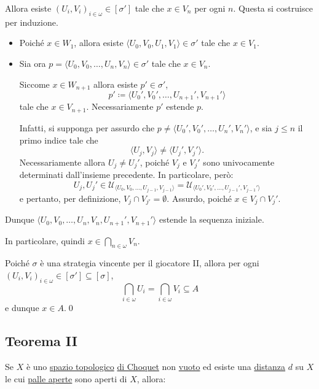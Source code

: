 \documentclass{article}
\newcommand{\1}{\mathds{1}}
\begin{document}
Allora esiste \((U_{i}, V_{i})_{i \in \omega} \in [\sigma']\) tale che \(x \in V_{n}\) per ogni \(n\). Questa si costruisce per induzione.
\begin{itemize}
\item Poiché \(x \in W_{1}\), allora esiste \(\langle U_{0},V_{0},U_{1},V_{1}\rangle \in \sigma'\) tale che \(x \in V_{1}\).
\item Sia ora \(p=\langle U_{0},V_{0},\dots,U_{n}, V_{n}\rangle \in\sigma'\) tale che \(x \in V_{n}\).

Siccome \(x \in W_{n+1}\) allora esiste \(p' \in\sigma'\),
\begin{equation*}
  p'\coloneqq \langle U_{0}',V_{0}',\dots,U_{n+1}',V_{n+1}'\rangle
\end{equation*}
tale che \(x \in V_{n+1}\). Necessariamente \(p'\) estende \(p\).

Infatti, si supponga per assurdo che \(p \neq \langle U_{0}',V_{0}',\dots,U_{n}',V_{n}'\rangle\), e sia \(j\le n\) il primo indice tale che
\begin{equation*}
  \langle U_{j}, V_{j}\rangle \neq \langle U_{j}', V_{j}'\rangle.
\end{equation*}
Necessariamente allora \(U_{j}\neq U_{j}'\), poiché \(V_{j}\) e \(V_{j}'\) sono univocamente determinati dall'insieme precedente. In particolare, però:
\begin{equation*}
  U_{j}, U_{j}' \in \mathcal{U}_{\langle U_{0},V_{0},\dots,U_{j-1},V_{j-1}\rangle} = \mathcal{U}_{\langle U_{0}',V_{0}',\dots,U_{j-1}',V_{j-1}'\rangle}
\end{equation*}
e pertanto, per definizione, \(V_{j}\cap V_{j'} = \emptyset\). Assurdo, poiché \(x \in V_{j}\cap V_{j}'\).
\end{itemize}

Dunque \(\langle U_{0},V_{0},\dots,U_{n}, V_{n}, U_{n+1}', V_{n+1}'\rangle\) estende la sequenza iniziale.

In particolare, quindi \(x \in \bigcap_{n \in \omega} V_{n}\).

Poiché \(\sigma\) è una strategia vincente per il giocatore II, allora per ogni \((U_{i}, V_{i})_{i \in \omega} \in [\sigma'] \subseteq [\sigma]\),
\begin{equation*}
\bigcap_{i \in \omega} U_{i} = \bigcap_{i \in \omega} V_{i}\subseteq A
\end{equation*}
e dunque \(x \in A\).\qed
\subsection{Teorema II}
\label{sec:orged1da91}
Se \(X\) è uno \href{../../../../../../../org/roam/20250103145124-topologia.org}{spazio topologico} \hyperref[sec:org12a4e1c]{di Choquet} non \href{../../../../../../../org/roam/20250131161811-insieme_vuoto_mk.org}{vuoto} ed esiste una \href{../../../../../../../org/roam/20250301193511-spazio_metrico.org}{distanza} \(d\) su \(X\) le cui \href{../../../../../../../org/roam/20250301193511-spazio_metrico.org}{palle aperte} sono aperti di \(X\), allora:
\end{document}
